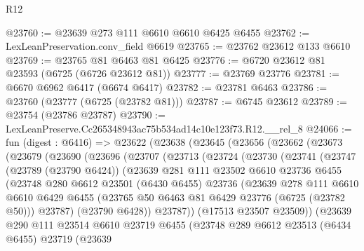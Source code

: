 \begin{lexlean}{R12}
\begin{coremodule}
@23760 := @23639 @273 @111 @6610 @6610 @6425 @6455
@23762 := LexLeanPreservation.conv_field @6619
@23765 := @23762 @23612 @133 @6610
@23769 := @23765 @81 @6463 @81 @6425
@23776 := @6720 @23612 @81 @23593 (@6725 (@6726 @23612 @81))
@23777 := @23769 @23776
@23781 := @6670 @6962 @6417 (@6674 @6417)
@23782 := @23781 @6463
@23786 := @23760 (@23777 (@6725 (@23782 @81)))
@23787 := @6745 @23612
@23789 := @23754 (@23786 @23787)
@23790 := LexLeanPreserve.Cc265348943ac75b534ad14c10e123f73.R12.__rel_8
@24066 := fun (digest : @6416) =>
  @23622
    (@23638
      (@23645
        (@23656
          (@23662
            (@23673
              (@23679
                (@23690
                  (@23696
                    (@23707
                      (@23713
                        (@23724
                          (@23730
                            (@23741
                              (@23747
                                (@23789 (@23790 @6424))
                                (@23639
                                  @281
                                  @111
                                  @23502
                                  @6610
                                  @23736
                                  @6455
                                  (@23748
                                    @280
                                    @6612
                                    @23501
                                    (@6430 @6455)
                                    @23736
                                    (@23639
                                      @278
                                      @111
                                      @6610
                                      @6610
                                      @6429
                                      @6455
                                      (@23765 @50 @6463 @81 @6429 @23776 (@6725 (@23782 @50)))
                                      @23787)
                                    (@23790 @6428))
                                  @23787))
                              (@17513 @23507 @23509))
                            (@23639
                              @290
                              @111
                              @23514
                              @6610
                              @23719
                              @6455
                              (@23748
                                @289
                                @6612
                                @23513
                                (@6434 @6455)
                                @23719
                                (@23639

\end{coremodule}
\end{lexlean}
